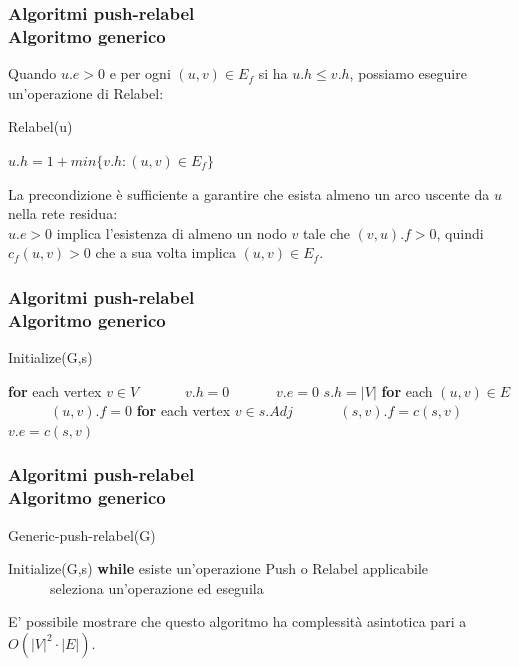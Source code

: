 \documentclass{beamer}
\begin{document}
\begin{frame}
\frametitle{Algoritmi push-relabel\\Algoritmo generico}
Quando $u.e>0$ e per ogni $(u,v)\in E_f$ si ha $u.h\leq v.h$, possiamo eseguire un'operazione di Relabel:
\begin{algorithm}[H]
    \caption{Relabel(u)}%
    \begin{algorithmic}[1]
        \State $u.h=1+min\{v.h:(u,v)\in E_f\}$
    \end{algorithmic}
    \label{alg_1}
\end{algorithm}
La precondizione è sufficiente a garantire che esista almeno un arco uscente da $u$ nella rete residua:\\
$u.e>0$ implica l'esistenza di almeno un nodo $v$ tale che $(v,u).f>0$,  quindi $c_f(u,v)>0$ che a sua volta implica $(u,v)\in E_f$.
\end{frame}

\begin{frame}
\frametitle{Algoritmi push-relabel\\Algoritmo generico}
\begin{algorithm}[H]
    \caption{Initialize(G,s)}%
    \begin{algorithmic}[1]
        \State \textbf{for} each vertex $v\in V$
        \State \ \ \ \ \ \ $v.h=0$
        \State \ \ \ \ \ \ $v.e=0$
        \State $s.h=|V|$
        \State \textbf{for} each $(u,v)\in E$
        \State \ \ \ \ \ \ $(u,v).f=0$
        \State \textbf{for} each vertex $v\in s.Adj$
        \State \ \ \ \ \ \ $(s,v).f=c(s,v)$
        \State \ \ \ \ \ \ $v.e=c(s,v)$
    \end{algorithmic}
    \label{alg_1}
\end{algorithm}
\end{frame}

\begin{frame}
\frametitle{Algoritmi push-relabel\\Algoritmo generico}
\begin{algorithm}[H]
    \caption{Generic-push-relabel(G)}%
    \begin{algorithmic}[1]
        \State Initialize(G,s)
        \State \textbf{while} esiste un'operazione Push o Relabel applicabile
        \State \ \ \ \ \ \ seleziona un'operazione ed eseguila
    \end{algorithmic}
    \label{alg_1}
\end{algorithm}
E' possibile mostrare che questo algoritmo ha complessità asintotica pari a $O(|V|^2\cdot|E|)$.
\end{frame}
\end{document}
